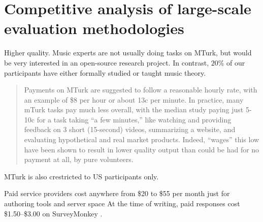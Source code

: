 \section{Competitive analysis of large-scale evaluation methodologies}




Higher quality. Music experts are not usually doing tasks on MTurk, but would
be very interested in an open-source research project. In contrast, $20\%$
 of our participants have either formally studied
or taught music theory.

\begin{quote}
Payments on MTurk are suggested to follow a reasonable hourly rate, with an
example of \$8 per hour or about 13c per minute. In practice, many mTurk
tasks pay much less overall, with the median study paying just 5-10c for a task
taking ``a few minutes,'' like watching and providing feedback on 3 short
(15-second) videos, summarizing a website, and evaluating hypothetical and real
market products. Indeed, ``wages'' this low have been shown to result in lower
quality output than could be had for no payment at all, by pure volunteers.
\end{quote}
\citep{downs2010your}

MTurk is also crestricted to US participants only\cite{quick2014kulitta}.

Paid service providers cost anywhere from \$20 to \$55 per month
just for authoring tools and server space\citep{JCC4:JCC411} At the time of writing,
paid responses cost \$1.50--\$3.00 on SurveyMonkey \citep{uksurveymonkey}.
